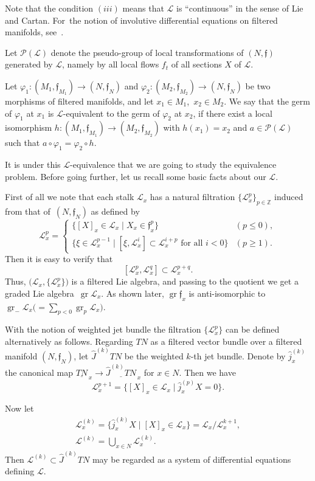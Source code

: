 \documentclass[10pt,a4paper]{amsart}
\newcommand{\Z}{\mathbb Z}
\newcommand{\cL}{\mathcal L}
\newcommand{\cP}{\mathcal P}
\newcommand{\f}{\mathfrak f}
\newcommand{\wJ}{\widehat J}
\newcommand{\wj}{\hat j}
\newcommand{\gr}{\operatorname{gr}}
\numberwithin{equation}{section}
\begin{document}
Note that the condition $(iii)$ means that $\cL$ is ``continuous'' in the sense of Lie and Cartan. For~the notion of involutive differential equations on filtered manifolds, see~\cite{Mor2002}.

Let $\cP(\cL)$ denote the pseudo-group of local transformations of $(N,\f)$ generated by $\cL$, namely by all local flows $f_t$ of all sections $X$ of $\cL$.

Let $\varphi_1\colon (M_1,\f_{M_1})\to (N,\f_N)$ and $\varphi_2\colon (M_2,\f_{M_2})\to (N,\f_N)$ be two morphisms of filtered manifolds, and let $x_1\in M_1$,\ $x_2\in M_2$.
We say that the germ of $\varphi_1$ at $x_1$ is $\cL$-equivalent to the germ of $\varphi_2$ at $x_2$, if there exist a local isomorphism $h\colon (M_1,\f_{M_1})\to (M_2,\f_{M_2})$ with $h(x_1)=x_2$ and $a\in \cP(\cL)$ such that $a\circ \varphi_1=\varphi_2\circ h$.

It is under this $\cL$-equivalence that we are going to study the equivalence problem. Before going further, let us recall some basic facts about our $\cL$.

First of all we note that each stalk $\cL_x$ has a natural filtration $\{\cL^p_x\}_{p\in\Z}$ induced from that of~$(N, \f_N)$ as defined by
\[
\cL_x^p =\begin{cases}
\big\{ [X]_x\in \cL_x \mid X_x \in\f^p_x \big\} & (p\le 0) ,
\\[1mm]
\big\{ \xi \in \cL^{p-1}_x \mid [\xi , \cL^i_x ] \subset \cL^{i+p}_x \text{ for all } i<0\big\} & (p\ge 1).
\end{cases}
\]
Then it is easy to verify that
\[
[\cL^p_x, \cL^q_x] \subset \cL^{p+q}_x.
\]
Thus, $\big(\cL_x, \{\cL^p_x\}\big)$ is a filtered Lie algebra, and passing to the quotient we get a graded Lie algebra~$\gr \cL_x$. As shown later, $\gr\f_x$ is anti-isomorphic to $\gr_{-} \cL_x \big({}=\sum_{p<0} \gr_p \cL_x\big)$.

With the notion of weighted jet bundle the filtration $\{\cL^p_x\}$ can be defined alternatively as follows. Regarding $TN$ as a filtered vector bundle over a filtered manifold $(N,\f_N)$, let $\wJ^{(k)}TN$ be the weighted $k$-th jet bundle. Denote by $\wj^{(k)}_x$ the canonical map $\underline{TN}_{\,x} \to \underline{\wJ^{(k)}TN}_{\,x}$ for $x\in N$. Then we have
\[
\cL^{p+1}_x = \big\{ [X]_x\in\cL_x \mid \wj^{(p)}_x X = 0 \big\}.
\]

Now let
\begin{gather*}
\cL^{(k)}_x =\big \{ \wj^{(k)}_xX \mid [X]_x\in \cL_x\big\} = \cL_x / \cL_x^{k+1},
\\
\cL^{(k)} = \bigcup_{x\in N} \cL^{(k)}_x.
\end{gather*}
Then $\cL^{(k)}\subset \wJ^{(k)}TN$ may be regarded as a system of differential equations defining $\cL$.
\end{document}
